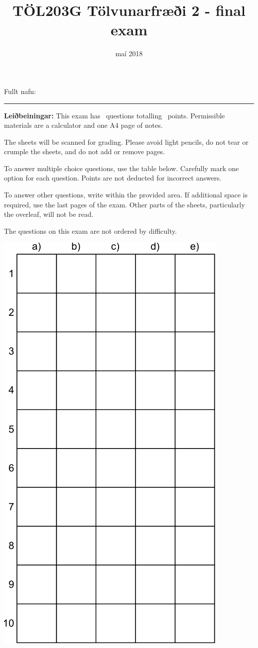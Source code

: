 \documentclass[addpoints]{exam}
\author{}
\date{}
\title{TÖL203G Tölvunarfræði 2 - final exam}
\author{}
\date{maí 2018}
\begin{document}
Fullt nafn: \vspace*{1mm} \hrule

\vspace{1cm}

\textbf{Leiðbeiningar:} This exam has \numquestions\ questions totalling \numpoints\ points.
Permissible materials are a calculator and one A4 page of notes.

The sheets will be scanned for grading. Please avoid light pencils, do not tear or crumple the sheets, and do not add or remove pages.

To answer multiple choice questions, use the table below. Carefully mark one option for each question. Points are not deducted for incorrect answers. 

To answer other questions, write within the provided area. If additional space is required, use the last pages of the exam. Other parts of the sheets, particularly the overleaf, will not be read.

The questions on this exam are not ordered by difficulty.

\begin{center}
	\includegraphics[width=0.4\linewidth]{Pics/svartafla}
\end{center}

\newpage
\end{document}

